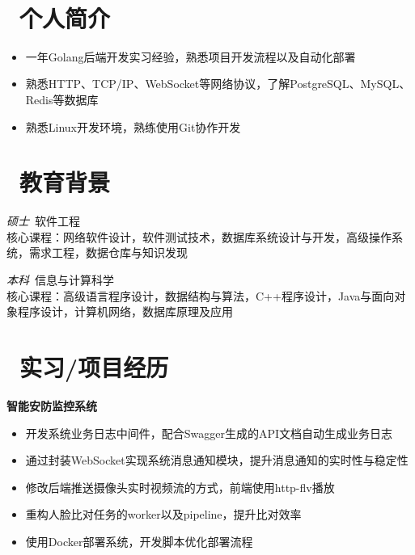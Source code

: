 \documentclass{resume}
\begin{document}


  \centerline { \textperiodcentered\ 
  }

\section{\faUsers\ 个人简介}
\begin{itemize}
  \item 一年Golang后端开发实习经验，熟悉项目开发流程以及自动化部署
  \item 熟悉HTTP、TCP/IP、WebSocket等网络协议，了解PostgreSQL、MySQL、Redis等数据库
  \item 熟悉Linux开发环境，熟练使用Git协作开发
\end{itemize}

\section{\faGraduationCap\ 教育背景}
\textit{硕士}\ 软件工程
\\核心课程：网络软件设计，软件测试技术，数据库系统设计与开发，高级操作系统，需求工程，数据仓库与知识发现

\textit{本科}\ 信息与计算科学
\\核心课程：高级语言程序设计，数据结构与算法，C++程序设计，Java与面向对象程序设计，计算机网络，数据库原理及应用


\section{\faBriefcase\ 实习/项目经历}
\textbf{智能安防监控系统}
\begin{itemize}
  \item 开发系统业务日志中间件，配合Swagger生成的API文档自动生成业务日志
  \item 通过封装WebSocket实现系统消息通知模块，提升消息通知的实时性与稳定性
  \item 修改后端推送摄像头实时视频流的方式，前端使用http-flv播放
  \item 重构人脸比对任务的worker以及pipeline，提升比对效率
  \item 使用Docker部署系统，开发脚本优化部署流程
\end{itemize}
\end{document}
